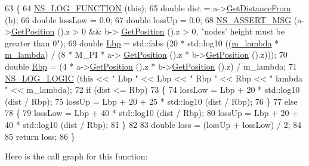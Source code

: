 \begin{DoxyCode}
63 \{
64   \hyperlink{log-macros-disabled_8h_a90b90d5bad1f39cb1b64923ea94c0761}{NS\_LOG\_FUNCTION} (\textcolor{keyword}{this});
65   \textcolor{keywordtype}{double} dist = a->\hyperlink{classns3_1_1MobilityModel_afa16c20b3c5fd135be075000f0272f31}{GetDistanceFrom} (b);
66   \textcolor{keywordtype}{double} lossLow = 0.0;
67   \textcolor{keywordtype}{double} lossUp = 0.0;
68   \hyperlink{assert_8h_aff5ece9066c74e681e74999856f08539}{NS\_ASSERT\_MSG} (a->\hyperlink{classns3_1_1MobilityModel_aba838f06ec5bbb2d193d94b8c0e4abb4}{GetPosition} ().z > 0 && b->
      \hyperlink{classns3_1_1MobilityModel_aba838f06ec5bbb2d193d94b8c0e4abb4}{GetPosition} ().z > 0, \textcolor{stringliteral}{"nodes' height must be greater than 0"});
69   \textcolor{keywordtype}{double} \hyperlink{loss__ITU1411__LOS_8m_a35266c556f65921311fc0bbae4146009}{Lbp} = std::fabs (20 * std::log10 ((\hyperlink{classns3_1_1ItuR1411LosPropagationLossModel_a86fc083a1850204ea9dfbde06c226c5e}{m\_lambda} * \hyperlink{classns3_1_1ItuR1411LosPropagationLossModel_a86fc083a1850204ea9dfbde06c226c5e}{m\_lambda}) / (8 * M\_PI * a->
      \hyperlink{classns3_1_1MobilityModel_aba838f06ec5bbb2d193d94b8c0e4abb4}{GetPosition} ().z * b->\hyperlink{classns3_1_1MobilityModel_aba838f06ec5bbb2d193d94b8c0e4abb4}{GetPosition} ().z)));
70   \textcolor{keywordtype}{double} \hyperlink{loss__ITU1411__LOS_8m_a907147085a14e8357fc5bf2ec49f99c5}{Rbp} = (4 * a->\hyperlink{classns3_1_1MobilityModel_aba838f06ec5bbb2d193d94b8c0e4abb4}{GetPosition} ().z * b->\hyperlink{classns3_1_1MobilityModel_aba838f06ec5bbb2d193d94b8c0e4abb4}{GetPosition} ().z) / m\_lambda;
71   \hyperlink{group__logging_ga88acd260151caf2db9c0fc84997f45ce}{NS\_LOG\_LOGIC} (\textcolor{keyword}{this} << \textcolor{stringliteral}{" Lbp "} << Lbp << \textcolor{stringliteral}{" Rbp "} << Rbp << \textcolor{stringliteral}{" lambda "} << m\_lambda);
72   \textcolor{keywordflow}{if} (dist <= Rbp)
73     \{
74       lossLow = Lbp + 20 * std::log10 (dist / Rbp);
75       lossUp = Lbp + 20 + 25 * std::log10 (dist / Rbp);
76     \}
77   \textcolor{keywordflow}{else}
78     \{
79       lossLow = Lbp + 40 * std::log10 (dist / Rbp);
80       lossUp = Lbp + 20 + 40 * std::log10 (dist / Rbp);
81     \}
82 
83   \textcolor{keywordtype}{double} loss = (lossUp + lossLow) / 2;
84 
85   \textcolor{keywordflow}{return} loss;
86 \}
\end{DoxyCode}


Here is the call graph for this function\+:





